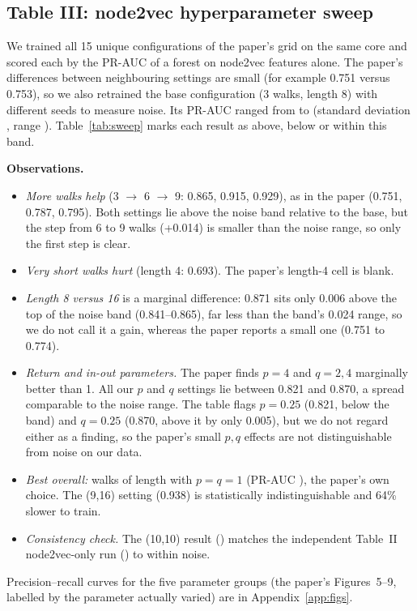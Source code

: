 \documentclass[11pt,a4paper]{article}
\begin{document}
\subsection{Table III: node2vec hyperparameter sweep}
We trained all 15 unique configurations of the paper's grid on the same core and scored each by the PR-AUC of a forest on node2vec features alone. The paper's differences between neighbouring settings are small (for example 0.751 versus 0.753), so we also retrained the base configuration ($3$ walks, length 8) with \NoiseN{} different seeds to measure noise. Its PR-AUC ranged from \NoiseLo{} to \NoiseHi{} (standard deviation \NoiseStd{}, range \NoiseRange{}). Table~\ref{tab:sweep} marks each result as above, below or within this band.
\begin{table}[H]
\centering\scriptsize

\caption{Sweep results (PR-AUC = area under the precision--recall curve; paper column is its undefined ``AUC'', so compare orderings, not values). ``vs.\ noise'' compares with the \NoiseLo--\NoiseHi{} band of retraining noise. Train s = seconds to train.}
\label{tab:sweep}
\end{table}
\textbf{Observations.}
\begin{itemize}
\item \emph{More walks help} (3 $\to$ 6 $\to$ 9: 0.865, 0.915, 0.929), as in the paper (0.751, 0.787, 0.795). Both settings lie above the noise band relative to the base, but the step from 6 to 9 walks (+0.014) is smaller than the noise range, so only the first step is clear.
\item \emph{Very short walks hurt} (length 4: 0.693). The paper's length-4 cell is blank.
\item \emph{Length 8 versus 16} is a marginal difference: 0.871 sits only 0.006 above the top of the noise band (0.841--0.865), far less than the band's 0.024 range, so we do not call it a gain, whereas the paper reports a small one (0.751 to 0.774).
\item \emph{Return and in-out parameters.} The paper finds $p=4$ and $q=2,4$ marginally better than 1. All our $p$ and $q$ settings lie between 0.821 and 0.870, a spread comparable to the noise range. The table flags $p=0.25$ (0.821, below the band) and $q=0.25$ (0.870, above it by only 0.005), but we do not regard either as a finding, so the paper's small $p,q$ effects are not distinguishable from noise on our data.
\item \emph{Best overall:} \BestWalks{} walks of length \BestLen{} with $p=q=1$ (PR-AUC \BestPRAUC), the paper's own choice. The (9,16) setting (0.938) is statistically indistinguishable and 64\% slower to train.
\item \emph{Consistency check.} The (10,10) result (\TenTenPRAUC) matches the independent Table~II node2vec-only run (\TableTwoNtvPRAUC) to within noise.
\end{itemize}
Precision--recall curves for the five parameter groups (the paper's Figures~5--9, labelled by the parameter actually varied) are in Appendix~\ref{app:figs}.
\end{document}
